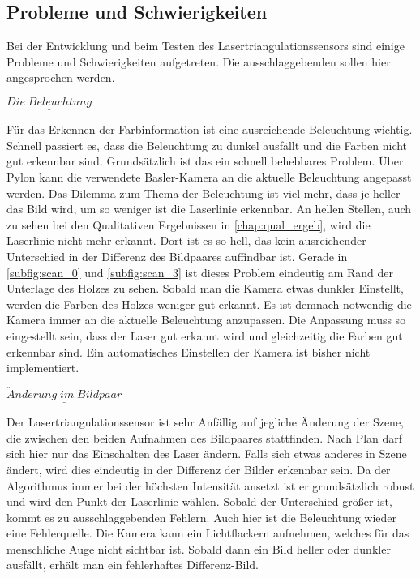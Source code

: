 		\subsection{Probleme und Schwierigkeiten}\label{chap:probleme_schwierigkeiten}
		Bei der Entwicklung und beim Testen des Lasertriangulationssensors sind einige Probleme und Schwierigkeiten aufgetreten. Die ausschlaggebenden sollen hier angesprochen werden.
		
		$\underline{Die \; Beleuchtung}$
		
		Für das Erkennen der Farbinformation ist eine ausreichende Beleuchtung wichtig. Schnell passiert es, dass die Beleuchtung zu dunkel ausfällt und die Farben nicht gut erkennbar sind. Grundsätzlich ist das ein schnell behebbares Problem. Über Pylon kann die verwendete Basler-Kamera an die aktuelle Beleuchtung angepasst werden. Das Dilemma zum Thema der Beleuchtung ist viel mehr, dass je heller das Bild wird, um so weniger ist die Laserlinie erkennbar. An hellen Stellen, auch zu sehen bei den Qualitativen Ergebnissen in \ref{chap:qual_ergeb}, wird die Laserlinie nicht mehr erkannt. Dort ist es so hell, das kein ausreichender Unterschied in der Differenz des Bildpaares auffindbar ist. Gerade in \ref{subfig:scan_0} und \ref{subfig:scan_3} ist dieses Problem eindeutig am Rand der Unterlage des Holzes zu sehen. Sobald man die Kamera etwas dunkler Einstellt, werden die Farben des Holzes weniger gut erkannt. Es ist demnach notwendig die Kamera immer an die aktuelle Beleuchtung anzupassen. Die Anpassung muss so eingestellt sein, dass der Laser gut erkannt wird und gleichzeitig die Farben gut erkennbar sind. Ein automatisches Einstellen der Kamera ist bisher nicht implementiert.
		
		$\underline{\ddot{A}nderung \; im \; Bildpaar}$
		
		Der Lasertriangulationssensor ist sehr Anfällig auf jegliche Änderung der Szene, die zwischen den beiden Aufnahmen des Bildpaares stattfinden. Nach Plan darf sich hier nur das Einschalten des Laser ändern. Falls sich etwas anderes in Szene ändert, wird dies eindeutig in der Differenz der Bilder erkennbar sein. Da der Algorithmus immer bei der höchsten Intensität ansetzt ist er grundsätzlich robust und wird den Punkt der Laserlinie wählen. Sobald der Unterschied größer ist, kommt es zu ausschlaggebenden Fehlern. Auch hier ist die Beleuchtung wieder eine Fehlerquelle. Die Kamera kann ein Lichtflackern aufnehmen, welches für das menschliche Auge nicht sichtbar ist. Sobald dann ein Bild heller oder dunkler ausfällt, erhält man ein fehlerhaftes Differenz-Bild.
		
